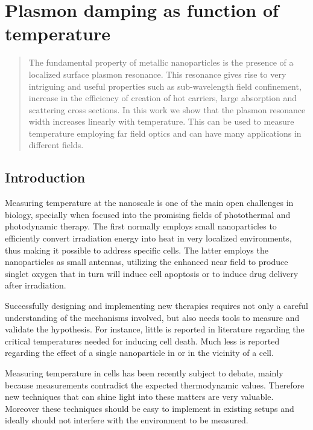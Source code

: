 \chapter{Plasmon damping as function of temperature}
\label{ch:Damping}

\begin{abstract}
The fundamental property of metallic nanoparticles is the presence of a
localized surface plasmon resonance. This resonance gives rise to very
intriguing and useful properties such as sub-wavelength field confinement,
increase in the efficiency of creation of hot carriers, large absorption and
scattering cross sections. In this work we show that the plasmon resonance width
increases linearly with temperature. This can be used to measure temperature
employing far field optics and can have many applications in different fields.
\end{abstract}

\newpage


\section{Introduction}
Measuring temperature at the nanoscale is one of the main open challenges in
biology\cite{Yang2011a}, specially when focused into the promising fields of
photothermal\cite{Huang2006a,Hirsch2003} and photodynamic
therapy\cite{West2003}. The first normally employs small nanoparticles to
efficiently convert irradiation energy into heat in very localized
environments\cite{Ma2014a}, thus making it possible to address specific
cells\cite{Hirsch2003,Huang2008}. The latter employs the nanoparticles as small
antennas, utilizing the enhanced near field to produce singlet oxygen that in
turn will induce cell apoptosis\cite{Hone2002} or to induce drug
delivery after irradiation\cite{Cheng2008}.

Successfully designing and implementing new therapies requires not only a
careful understanding of the mechanisms involved, but also needs tools to
measure and validate the hypothesis. For instance, little is reported in
literature regarding the critical temperatures needed for inducing cell
death\cite{Huang2006a}. Much less is reported regarding the effect of a single
nanoparticle in or in the vicinity of a cell.

Measuring temperature in cells has been recently subject to debate, mainly
because measurements contradict the expected thermodynamic
values\cite{Tanimoto2016,Donner2013,Yang2011a}. Therefore new
techniques that can shine light into these matters are very valuable. Moreover
these techniques should be easy to implement in existing setups and ideally
should not interfere with the environment to be measured.

